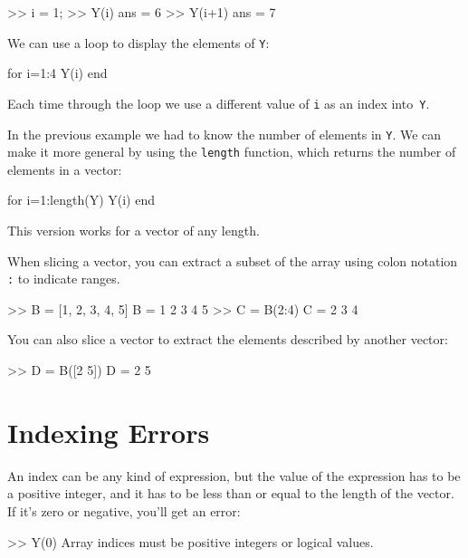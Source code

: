 \documentclass[../../book.tex]{subfiles}
\begin{document}
\begin{code}
>> i = 1;
>> Y(i)
ans = 6
>> Y(i+1)
ans = 7
\end{code}

We can use a loop to display the elements of \lstinline{Y}:


\begin{code}
for i=1:4
     Y(i)
end
\end{code}

Each time through the loop we use a different value of \lstinline{i}
as an index into~\lstinline{Y}.


In the previous example we had to know the number
of elements in \lstinline{Y}.  We can make it more general by using
the \lstinline{length} function, which returns the number of elements
in a vector:

\begin{code}
for i=1:length(Y)
     Y(i)
end
\end{code}

This version works for a vector of any length.

When slicing a vector, you can extract a subset of the array using colon notation \lstinline{:} to indicate ranges.
\begin{code}
    >> B = [1, 2, 3, 4, 5]
    B =
         1     2     3     4     5
    >> C = B(2:4)
    C =
         2     3     4
\end{code}

You can also slice a vector to extract the elements described by another vector:
\begin{code}
    >> D = B([2 5])
    D =
         2     5
\end{code}

\section{Indexing Errors}


An index can be any kind of expression, but the value of the
expression has to be a positive integer, and it has to be
less than or equal to the length of the vector.  If it's
zero or negative, you'll get an error:

\begin{code}
>> Y(0)
Array indices must be positive integers or logical values.
\end{code}
\end{document}
